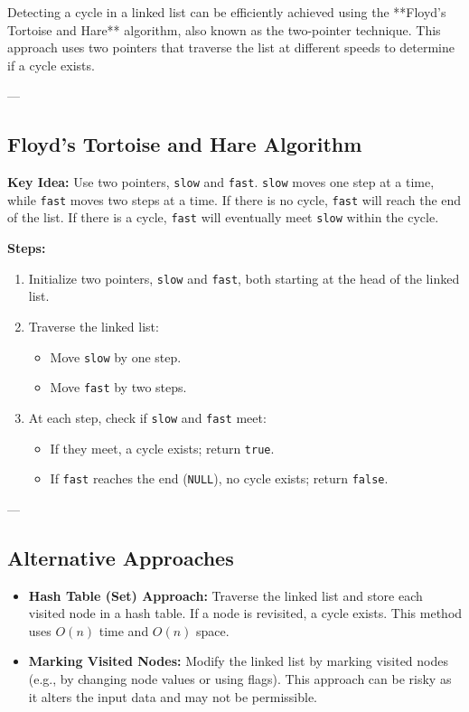 Detecting a cycle in a linked list can be efficiently achieved using the **Floyd’s Tortoise and Hare** algorithm, also known as the two-pointer technique. This approach uses two pointers that traverse the list at different speeds to determine if a cycle exists.

---

\subsection*{Floyd’s Tortoise and Hare Algorithm}
\textbf{Key Idea:}
Use two pointers, \texttt{slow} and \texttt{fast}. \texttt{slow} moves one step at a time, while \texttt{fast} moves two steps at a time. If there is no cycle, \texttt{fast} will reach the end of the list. If there is a cycle, \texttt{fast} will eventually meet \texttt{slow} within the cycle.

\textbf{Steps:}
\begin{enumerate}
    \item Initialize two pointers, \texttt{slow} and \texttt{fast}, both starting at the head of the linked list.
    \item Traverse the linked list:
    \begin{itemize}
        \item Move \texttt{slow} by one step.
        \item Move \texttt{fast} by two steps.
    \end{itemize}
    \item At each step, check if \texttt{slow} and \texttt{fast} meet:
    \begin{itemize}
        \item If they meet, a cycle exists; return \texttt{true}.
        \item If \texttt{fast} reaches the end (\texttt{NULL}), no cycle exists; return \texttt{false}.
    \end{itemize}
\end{enumerate}

---

\subsection*{Alternative Approaches}
\begin{itemize}
    \item \textbf{Hash Table (Set) Approach:} Traverse the linked list and store each visited node in a hash table. If a node is revisited, a cycle exists. This method uses \(O(n)\) time and \(O(n)\) space.
    \item \textbf{Marking Visited Nodes:} Modify the linked list by marking visited nodes (e.g., by changing node values or using flags). This approach can be risky as it alters the input data and may not be permissible.
\end{itemize}

